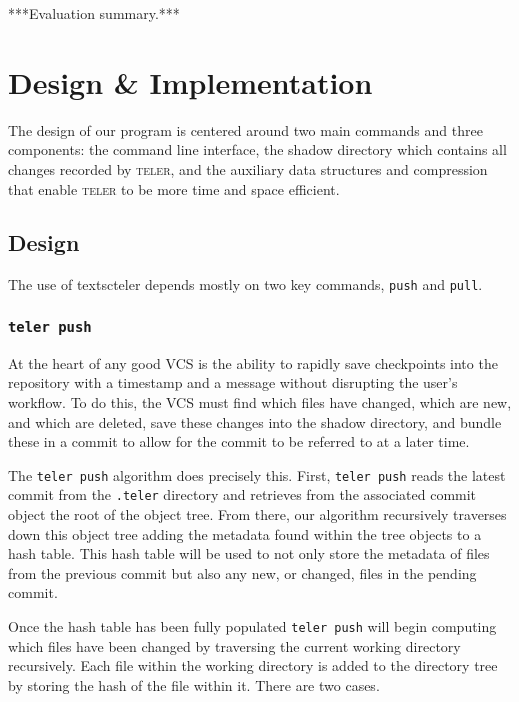 \documentclass[12pt, letterpaper]{article}
\begin{document}
\begin{multicols}{2}
  ***Evaluation summary.***

  \section{Design \& Implementation}
  \label{sec:desimp}
  The design of our program is centered around two main commands and
  three components: the command line interface, the shadow directory
  which contains all changes recorded by \textsc{teler}, and the
  auxiliary data structures and compression that enable \textsc{teler}
  to be more time and space efficient.

  \subsection{Design}
  \label{subsec:design}
  The use of textsc{teler} depends mostly on two key commands,
  \texttt{push} and \texttt{pull}.

  \subsubsection{\texttt{teler push}}
  \label{subsubsec:push}
  At the heart of any good VCS is the ability to rapidly save
  checkpoints into the repository with a timestamp and a message
  without disrupting the user's workflow. To do this, the VCS must
  find which files have changed, which are new, and which are deleted,
  save these changes into the shadow directory, and bundle these in a
  commit to allow for the commit to be referred to at a later time.

  The \texttt{teler push} algorithm does precisely this. First,
  \texttt{teler push} reads the latest commit from the \texttt{.teler}
  directory and retrieves from the associated commit object the root
  of the object tree. From there, our algorithm recursively traverses
  down this object tree adding the metadata found within the tree
  objects to a hash table. This hash table will be used to not only
  store the metadata of files from the previous commit but also any
  new, or changed, files in the pending commit.

  Once the hash table has been fully populated \texttt{teler push}
  will begin computing which files have been changed by traversing the
  current working directory recursively. Each file within the working
  directory is added to the directory tree by storing the hash of the
  file within it. There are two cases.


\end{multicols}
\end{document}

